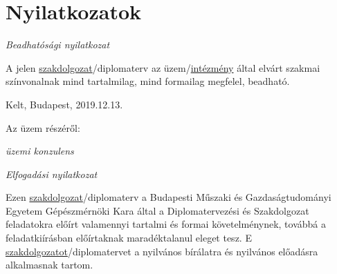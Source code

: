 \cleardoublepage{}
\chapter*{Nyilatkozatok}

\vspace{-4ex}
\begin{center}
	\large{}
	\itshape{}
	Beadhatósági nyilatkozat
\end{center}

\vspace{-2ex}
\noindent
A jelen \underline{szakdolgozat}/diplomaterv az üzem/\underline{intézmény} által elvárt szakmai színvonalnak mind tartalmilag, mind formailag megfelel, beadható.

\vspace{1ex}
Kelt, Budapest, 2019.12.13.

\hspace{6cm} \parbox[][][c]{8cm}{
	Az üzem részéről:
	\center{} \dotfill{}
	
	\textit{üzemi konzulens}}





\vfill
\begin{center}
	\large{}
	\itshape{}
	Elfogadási nyilatkozat
\end{center}

\vspace{-2ex}
\noindent
Ezen \underline{szakdolgozat}/diplomaterv a Budapesti Műszaki és Gazdaságtudományi Egyetem Gépészmérnöki Kara által a Diplomatervezési és Szakdolgozat feladatokra előírt valamennyi tartalmi és formai követelménynek, továbbá a feladatkiírásban előírtaknak maradéktalanul eleget tesz. E \underline{szakdolgozatot}/diplomatervet a nyilvános bírálatra és nyilvános előadásra alkalmasnak tartom. 

